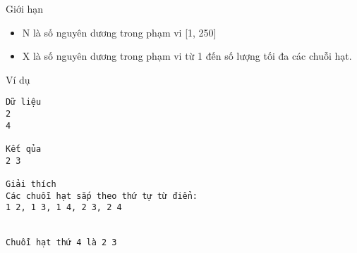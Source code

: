 Giới hạn  
\begin{itemize}
	\item     N là số nguyên dương trong phạm vi [1, 250]   
	\item     X là số nguyên dương trong phạm vi từ 1 đến số lượng tối đa các chuỗi hạt.   
\end{itemize}
   Ví dụ  
\begin{verbatim}
Dữ liệu
2
4

Kết qủa
2 3

Giải thích
Các chuỗi hạt sắp theo thứ tự từ điển:
1 2, 1 3, 1 4, 2 3, 2 4


Chuỗi hạt thứ 4 là 2 3

\end{verbatim}
